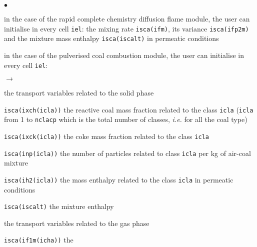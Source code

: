 {{{\begin{list}{$\bullet$}{}
        \item in the case of the rapid complete chemistry diffusion flame
             module, the user can initialise in every cell \texttt{iel}: the
             mixing rate \texttt{isca(ifm)}, its variance
             \texttt{isca(ifp2m)} and the mixture mass
             enthalpy \texttt{isca(iscalt)} in permeatic conditions

        \item in the case of the pulverised coal combustion module, the
             user can initialise in every cell \texttt{iel}:
              \begin{list}{$\rightarrow$}{}
                     \item the transport variables related to the solid phase
                           \begin{list}{}{}
                                  \item \texttt{isca(ixch(icla))}
                                  the reactive coal mass fraction related to the
                                  class \texttt{icla} (\texttt{icla} from 1 to
                                  \texttt{nclacp} which is the total number of
                                  classes, {\em i.e.} for all the coal type)
                                  \item \texttt{isca(ixck(icla))}
                                  the coke mass fraction related to the class
                                  \texttt{icla}
                                  \item \texttt{isca(inp(icla))} the
                                  number of particles related to class
                                  \texttt{icla} per kg of air-coal mixture
                                  \item \texttt{isca(ih2(icla))} the
                                   mass enthalpy related to the class
                                   \texttt{icla} in permeatic conditions
                           \end{list}
                     \item \texttt{isca(iscalt)} the mixture enthalpy
                     \item the transport variables related to the gas phase
                           \begin{list}{}{}
                                  \item
                                       \texttt{isca(if1m(icha))} the

\end{list}
\end{list}
\end{list}}}}
